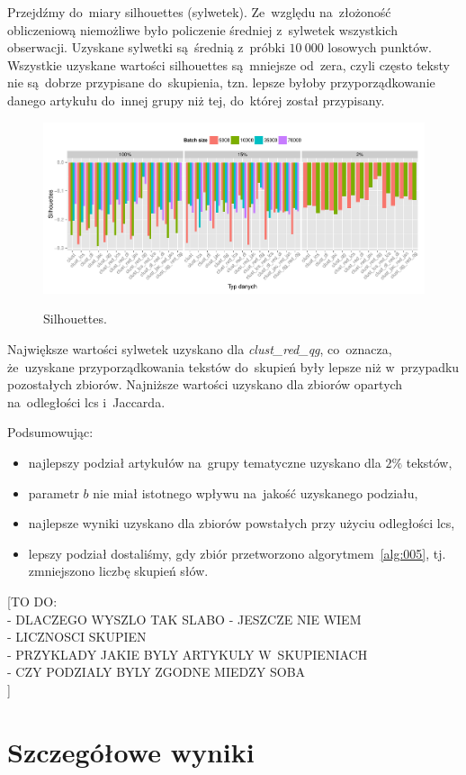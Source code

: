 \documentclass{praca1}
\begin{document}
Przejdźmy do~miary silhouettes (sylwetek). Ze~względu na~złożoność obliczeniową niemożliwe było policzenie średniej z~sylwetek wszystkich obserwacji. Uzyskane sylwetki są~średnią z~próbki $10\ 000$ losowych punktów. Wszystkie uzyskane wartości silhouettes są~mniejsze od~zera, czyli często teksty nie są~dobrze przypisane do~skupienia, tzn. lepsze byłoby przyporządkowanie danego artykułu do~innej grupy niż tej, do~której został przypisany.

\begin{figure}[!h]
  \centering
  \includegraphics[width=400pt]{plot14.pdf}\\
  \caption{Silhouettes.}\label{plot:009}
\end{figure}

Największe wartości sylwetek uzyskano dla \emph{clust\_red\_qg}, co~oznacza, że~uzyskane przyporządkowania tekstów do~skupień były lepsze niż w~przypadku pozostałych zbiorów. Najniższe wartości uzyskano dla zbiorów opartych na~odległości lcs i~Jaccarda.

Podsumowując:
\begin{itemize}
\item najlepszy podział artykułów na~grupy tematyczne uzyskano dla $2\%$ tekstów,
\item parametr $b$ nie miał istotnego wpływu na~jakość uzyskanego podziału,
\item najlepsze wyniki uzyskano dla zbiorów powstałych przy użyciu odległości lcs,
\item lepszy podział dostaliśmy, gdy zbiór przetworzono algorytmem~\ref{alg:005}, tj. zmniejszono liczbę skupień słów.
\end{itemize}

[TO DO:\\
- DLACZEGO WYSZLO TAK SLABO - JESZCZE NIE WIEM\\
- LICZNOSCI SKUPIEN\\
- PRZYKLADY JAKIE BYLY ARTYKULY W~SKUPIENIACH\\
- CZY PODZIALY BYLY ZGODNE MIEDZY SOBA\\
]

\section{Szczegółowe wyniki}







\end{document}
